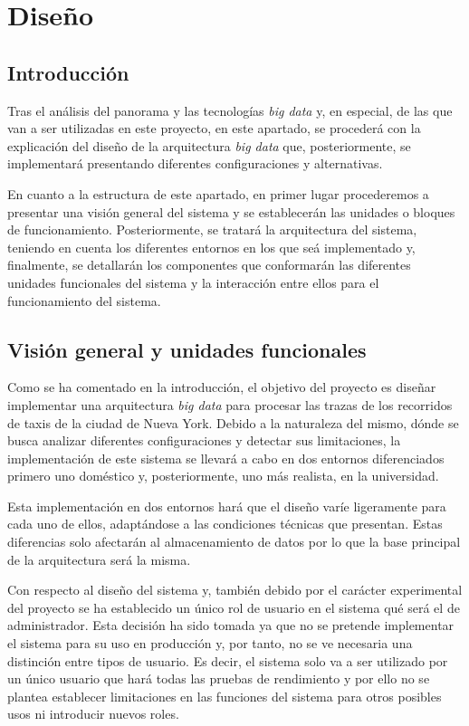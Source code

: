 \chapter{Diseño \label{sec:disenho}}

\section{Introducción}
Tras el análisis del panorama y las tecnologías \textit{big data} y, en especial, de las que van a ser utilizadas en este proyecto, en este apartado, se procederá con la explicación del diseño de la arquitectura \textit{big data} que, posteriormente, se implementará presentando diferentes configuraciones y alternativas.

En cuanto a la estructura de este apartado, en primer lugar procederemos a presentar una visión general del sistema y se establecerán las unidades o bloques de funcionamiento. Posteriormente, se tratará la arquitectura del sistema, teniendo en cuenta los diferentes entornos en los que seá implementado y, finalmente, se detallarán los componentes que conformarán las diferentes unidades funcionales del sistema y la interacción entre ellos para el funcionamiento del sistema.

\section{Visión general y unidades funcionales \label{unitFunc}}
Como se ha comentado en la introducción, el objetivo del proyecto es diseñar implementar una arquitectura \textit{big data} para procesar las trazas de los recorridos de taxis de la ciudad de Nueva York. Debido a la naturaleza del mismo, dónde se busca analizar diferentes configuraciones y detectar sus limitaciones, la implementación de este sistema se llevará a cabo en dos entornos diferenciados primero uno doméstico y, posteriormente, uno más realista, en la universidad.

\clearpage
Esta implementación en dos entornos hará que el diseño varíe ligeramente para cada uno de ellos, adaptándose a las condiciones técnicas que presentan. Estas diferencias solo afectarán al almacenamiento de datos por lo que la base principal de la arquitectura será la misma.

Con respecto al diseño del sistema y, también debido por el carácter experimental del proyecto se ha establecido un único rol de usuario en el sistema qué será el de administrador. Esta decisión ha sido tomada ya que no se pretende implementar el sistema para su uso en producción y, por tanto, no se ve necesaria una distinción entre tipos de usuario. Es decir, el sistema solo va a ser utilizado por un único usuario que hará todas las pruebas de rendimiento y por ello no se plantea establecer limitaciones en las funciones del sistema para otros posibles usos ni introducir nuevos roles.

